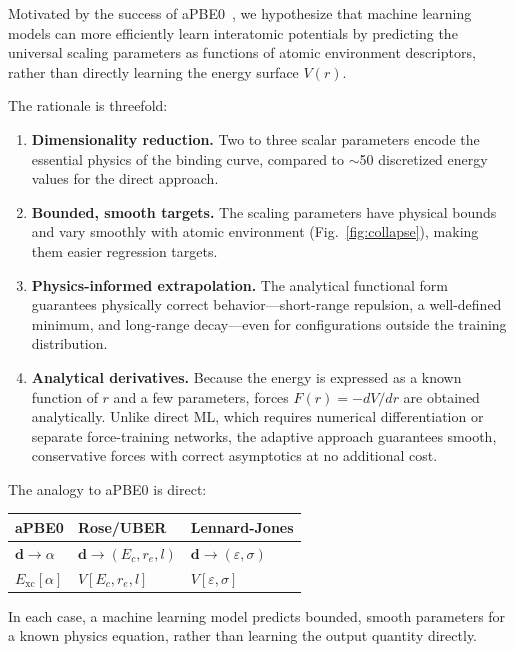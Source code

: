 \documentclass[aps,prb,twocolumn,superscriptaddress,longbibliography,floatfix]{revtex4-2}
\begin{document}
Motivated by the success of aPBE0~\cite{Khan2025}, we hypothesize that machine learning models can more efficiently learn interatomic potentials by predicting the universal scaling parameters as functions of atomic environment descriptors, rather than directly learning the energy surface $V(r)$.

The rationale is threefold:
\begin{enumerate}
  \item \textbf{Dimensionality reduction.} Two to three scalar parameters encode the essential physics of the binding curve, compared to $\sim$50 discretized energy values for the direct approach.
  \item \textbf{Bounded, smooth targets.} The scaling parameters have physical bounds and vary smoothly with atomic environment (Fig.~\ref{fig:collapse}), making them easier regression targets.
  \item \textbf{Physics-informed extrapolation.} The analytical functional form guarantees physically correct behavior---short-range repulsion, a well-defined minimum, and long-range decay---even for configurations outside the training distribution.
  \item \textbf{Analytical derivatives.} Because the energy is expressed as a known function of $r$ and a few parameters, forces $F(r) = -dV/dr$ are obtained analytically. Unlike direct ML, which requires numerical differentiation or separate force-training networks, the adaptive approach guarantees smooth, conservative forces with correct asymptotics at no additional cost.
\end{enumerate}

The analogy to aPBE0 is direct:
\begin{center}
\begin{tabular}{lll}
  \toprule
  aPBE0 & Rose/UBER & Lennard-Jones \\
  \midrule
  $\mathbf{d} \to \alpha$ & $\mathbf{d} \to (E_c, r_e, l)$ & $\mathbf{d} \to (\varepsilon, \sigma)$ \\
  $E_\mathrm{xc}[\alpha]$ & $V[E_c, r_e, l]$ & $V[\varepsilon, \sigma]$ \\
  \bottomrule
\end{tabular}
\end{center}
In each case, a machine learning model predicts bounded, smooth parameters for a known physics equation, rather than learning the output quantity directly.


\end{document}
